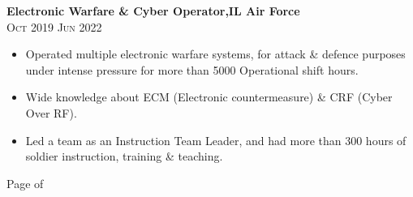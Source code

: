 \documentclass[oneside]{article}
\begin{document}
{\begin{minipage}[t][\dimexpr\textheight-2\fboxrule-2\fboxsep\relax][t]{\dimexpr0.55\textwidth-2\fboxrule-2\fboxsep\relax}
\begin{itemize}
        \end{itemize}

                  \textbf{\large Electronic Warfare \& Cyber Operator,IL Air Force} \\
                    {\scshape{}\selectfont\footnotesize Oct 2019 \textendash{} Jun 2022} 
                    \vspace{0.5\baselineskip} 
        \begin{itemize}
            \setlength{\itemsep}{-3pt}
            \begin{itemize}
                \item Operated multiple electronic warfare systems, for attack \& defence purposes under intense pressure  for more than 5000 Operational shift hours.
                \item Wide knowledge about ECM (Electronic countermeasure) \& CRF (Cyber Over RF).
                \item Led a team as an Instruction Team Leader, and had more than 300 hours of soldier instruction, training \& teaching.
            \end{itemize}

        \end{itemize}

               \vfill%
        {\hfill\small{}\selectfont Page \thepage \hspace{0.1em} of \pageref{LastPage}\hfill}
    \end{minipage}
}%
\newpage
\end{document}
